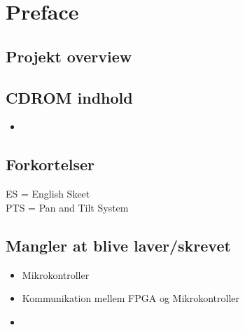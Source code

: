 \section*{Preface}

\subsection*{Projekt overview}


\subsection*{CDROM indhold}
\begin{itemize}
\item 
\end{itemize}



\subsection*{Forkortelser}
ES = English Skeet \\
PTS = Pan and Tilt System



\newpage
\subsection*{Mangler at blive laver/skrevet}
\begin{itemize}

\item Mikrokontroller
\item Kommunikation mellem FPGA og Mikrokontroller
\item 
\end{itemize}
\listoftodos